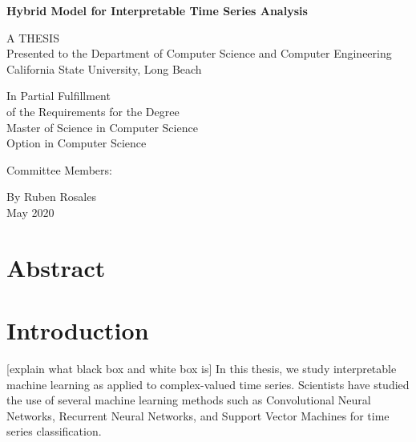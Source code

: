\documentclass{turabian-thesis}
\begin{document}
\frontmatter
\thispagestyle{empty}

\begin{center}
   
   \textbf{Hybrid Model for Interpretable Time Series Analysis}
   
   \vspace*{\baselineskip} 
      
   A THESIS \\
   Presented to the Department of Computer Science and Computer Engineering \\
   California State University, Long Beach
   
   \vspace*{\baselineskip} 

   In Partial Fulfillment \\
   of the Requirements for the Degree \\
   Master of Science in Computer Science \\
   Option in Computer Science
   
   \vspace*{\baselineskip} 

   Committee Members: \\
   
   \vspace*{\baselineskip} 

   By Ruben Rosales \\
   May 2020
\end{center}

\pagebreak

\chapter*{Abstract}

\tableofcontents
\listofillustrations

\mainmatter

\chapter{Introduction}

[explain what black box and white box is]
In this thesis, we study interpretable machine learning as applied to complex-valued time series. Scientists have studied the use of several machine learning methods such as Convolutional Neural Networks, Recurrent Neural Networks, and Support Vector Machines for time series classification.
 
\end{document}
